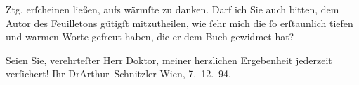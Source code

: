                   Ztg. erſcheinen ließen, aufs wärmſte zu danken. Darf ich Sie auch bitten, dem
                  Autor des Feuilletons gütigſt mitzutheilen, wie ſehr
               mich {\pb}die ſo erſtaunlich tiefen und warmen Worte
               gefreut haben, die er dem Buch
               gewidmet hat? –\pend
           
\pstart
           Seien Sie, verehrteſter Herr Doktor, meiner herzlichen Ergebenheit jederzeit
               verſichert!\pend
           \pstart Ihr \spacefill\mbox{DrArthur Schnitzler}\pend{}
\pstart
           Wien, 7. 12. 94.\pend
           \endnumbering{}  
      